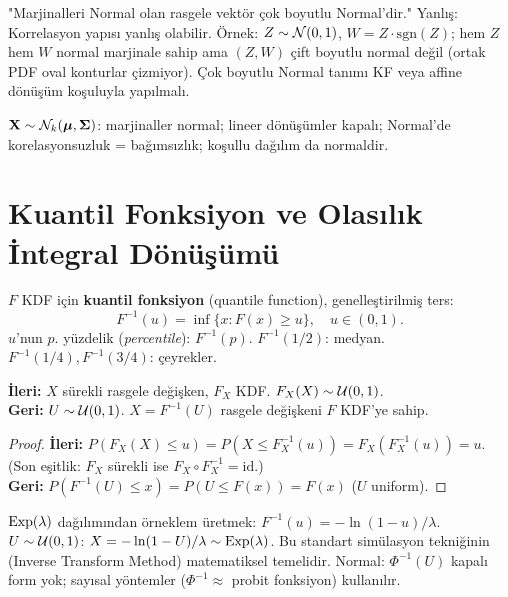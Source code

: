 \begin{hataanalizi}
"Marjinalleri Normal olan rasgele vektör çok boyutlu Normal'dir."
Yanlış: Korrelasyon yapısı yanlış olabilir. Örnek: $Z \sim \mathcal{N}(0,1)$,
$W = Z \cdot \mathrm{sgn}(Z)$; hem $Z$ hem $W$ normal marjinale sahip
ama $(Z, W)$ çift boyutlu normal değil (ortak PDF oval konturlar çizmiyor).
Çok boyutlu Normal tanımı KF veya affine dönüşüm koşuluyla yapılmalı.
\end{hataanalizi}

\begin{mikroozet}
$\mathbf{X}\sim\mathcal{N}_k(\boldsymbol{\mu},\boldsymbol{\Sigma})$: marjinaller normal; lineer dönüşümler kapalı;
Normal'de korelasyonsuzluk = bağımsızlık; koşullu dağılım da normaldir.
\end{mikroozet}

\section{Kuantil Fonksiyon ve Olasılık İntegral Dönüşümü}
\label{sec:kuantil_fonksiyon}

\begin{tanim}
\label{def:kuantil_fonksiyon}
$F$ KDF için \textbf{kuantil fonksiyon} (quantile function), genelleştirilmiş ters:
\[
  F^{-1}(u) = \inf\{x : F(x) \geq u\}, \quad u \in (0,1).
\]
$u$'nun $p$. yüzdelik (\textit{percentile}): $F^{-1}(p)$.
$F^{-1}(1/2)$: medyan. $F^{-1}(1/4), F^{-1}(3/4)$: çeyrekler.
\end{tanim}

\begin{teorem}
\label{thm:oit}
\textbf{İleri:} $X$ sürekli rasgele değişken, $F_X$ KDF. $F_X(X) \sim \mathcal{U}(0,1)$.\\
\textbf{Geri:} $U \sim \mathcal{U}(0,1)$. $X = F^{-1}(U)$ rasgele değişkeni $F$ KDF'ye sahip.
\end{teorem}

\begin{proof}
\textbf{İleri:} $P(F_X(X) \leq u) = P(X \leq F_X^{-1}(u)) = F_X(F_X^{-1}(u)) = u$.
(Son eşitlik: $F_X$ sürekli ise $F_X \circ F_X^{-1} = \mathrm{id}$.)\\
\textbf{Geri:} $P(F^{-1}(U) \leq x) = P(U \leq F(x)) = F(x)$ ($U$ uniform).
\end{proof}

\begin{ornek}
$\operatorname{Exp}(\lambda)$ dağılımından örneklem üretmek:
$F^{-1}(u) = -\ln(1-u)/\lambda$.
$U \sim \mathcal{U}(0,1)$: $X = -\ln(1-U)/\lambda \sim \operatorname{Exp}(\lambda)$.
Bu standart simülasyon tekniğinin (Inverse Transform Method) matematiksel temelidir.
Normal: $\Phi^{-1}(U)$ kapalı form yok; sayısal yöntemler ($\Phi^{-1} \approx$ probit fonksiyon) kullanılır.
\end{ornek}

